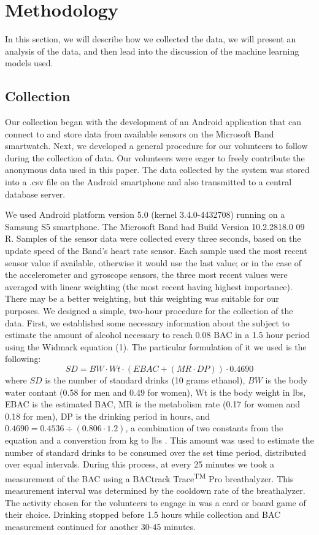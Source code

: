 \section{Methodology}

In this section, we will describe how we collected the data, we will present an analysis of the data, and then lead into the discussion of the machine learning models used.

\subsection{Collection}

Our collection began with the development of an Android application that can connect to and store data from available sensors on the Microsoft Band smartwatch. Next, we developed a general procedure for our volunteers to follow during the collection of data. Our volunteers were eager to freely contribute the anonymous data used in this paper. The data collected by the system was stored into a .csv file on the Android smartphone and also transmitted to a central database server.

We used Android platform version 5.0 (kernel 3.4.0-4432708) running on a Samsung S5 smartphone. The Microsoft Band had Build Version 10.2.2818.0 09 R. Samples of the sensor data were collected every three seconds, based on the update speed of the Band's heart rate sensor. Each sample used the most recent sensor value if available, otherwise it would use the last value; or in the case of the accelerometer and gyroscope sensors, the three most recent values were averaged with linear weighting (the most recent having highest importance). There may be a better weighting, but this weighting was suitable for our purposes.
We designed a simple, two-hour procedure for the collection of the data. First, we established some necessary information about the subject to estimate the amount of alcohol necessary to reach 0.08 BAC in a 1.5 hour period using the Widmark equation (1). The particular formulation of it we used is the following: \begin{equation}
SD =  BW \cdot Wt \cdot (EBAC + (MR \cdot DP)) \cdot 0.4690
\end{equation} where $SD$ is the number of standard drinks (10 grams ethanol), $BW$ is the body water contant (0.58 for men and 0.49 for women), Wt is the body weight in lbs, EBAC is the estimated BAC, MR is the metabolism rate (0.17 for women and 0.18 for men), DP is the drinking period in hours, and  $0.4690 = 0.4536 \div (0.806 \cdot 1.2)$, a combination of two constants from the equation and a converstion from kg to lbs \cite{Andersson:2009}\cite{Wiki:BAC}. This amount was used to estimate the number of standard drinks to be consumed over the set time period, distributed over equal intervals. During this process, at every 25 minutes we took a measurement of the BAC using a BACtrack Trace\textsuperscript{TM} Pro breathalyzer. This measurement interval was determined by the cooldown rate of the breathalyzer. The activity chosen for the volunteers to engage in was a card or board game of their choice. Drinking stopped before 1.5 hours while collection and BAC measurement continued for another 30-45 minutes.

